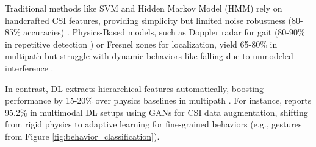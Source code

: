 \documentclass[Afour,sageh,times]{sagej}
\begin{document}
Traditional methods like SVM and Hidden Markov Model (HMM) rely on handcrafted CSI features, providing simplicity but limited noise robustness (80-85\% accuracies) \citep{guo2019robust, yan2020wiact}. Physics-Based models, such as Doppler radar for gait (80-90\% in repetitive detection \citep{wang2016gait}) or Fresnel zones for localization, yield 65-80\% in multipath but struggle with dynamic behaviors like falling due to unmodeled interference \citep{guo2019robust}.

In contrast, DL extracts hierarchical features automatically, boosting performance by 15-20\% over physics baselines in multipath \citep{wang2021multimodal, shen2022graph}. For instance, \citep{wang2021multimodal} reports 95.2\% in multimodal DL setups using GANs for CSI data augmentation, shifting from rigid physics to adaptive learning for fine-grained behaviors (e.g., gestures from Figure \ref{fig:behavior_classification}).
\end{document}
